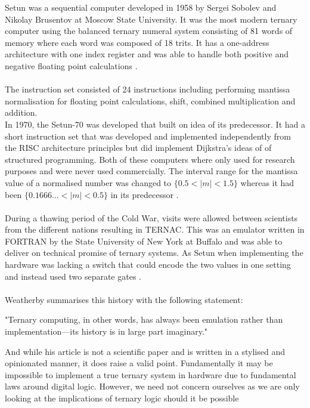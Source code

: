 \documentclass[12pt]{article}
\begin{document}
Setun was a sequential computer developed in 1958 by Sergei Sobolev and Nikolay Brusentov at Moscow State University. It was the most 
modern ternary computer using the balanced ternary numeral system consisting of 81 words of memory where each word was 
composed of 18 trits.  It has a one-address architecture with one index register and was able to handle both positive and 
negative floating point calculations \citep{weatherby2018ternary} \citep{brousentsov2002development}.\\
\\
The instruction set consisted of 24 instructions including performing mantissa normalisation for floating point calculations,
shift, combined multiplication and addition.
\\
In 1970, the Setun-70 was developed that built on idea of its predecessor. It had a short instruction set that was developed 
and implemented independently from the RISC architecture principles but did implement Dijkstra's ideas of of structured 
programming. Both of these computers where only used for research purposes and were never used commercially. The interval range 
for the mantissa value of a normalised number was changed to $\{0.5 < |m| < 1.5\}$ whereas it had been $\{0.1666... < |m| < 0.5\}$ 
in its predecessor \citep{brousentsov2002development}.\\
\\
During a thawing period of the Cold War, visits were allowed between scientists from the different nations resulting in 
TERNAC. This was an emulator written in FORTRAN by the State University of New York at Buffalo and was able to deliver 
on technical promise of ternary systems. As Setun when implementing the hardware was lacking a switch that could encode 
the two values in one setting and instead used two separate gates \citep{weatherby2018ternary}.\\
\\
Weatherby summarises this history with the following statement:
\begin{displayquote}
    "Ternary computing, in other words, has always been emulation rather than implementation—its history is in large part imaginary."
\end{displayquote}
And while his article is not a scientific paper and is written in a stylised and opinionated manner, it does raise a valid point.  
Fundamentally it may be impossible to implement a true ternary system in hardware due to fundamental laws around digital logic. 
However, we need not concern ourselves as we are only looking at the implications of ternary logic should it be possible 
\end{document}
